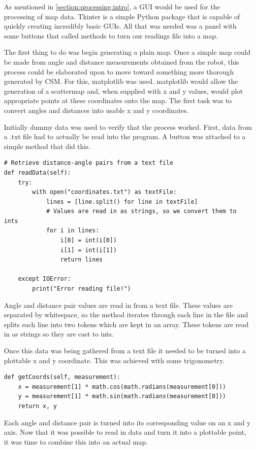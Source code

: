				As mentioned in \ref{section:processing:intro}, a GUI would be used for the processing of map data. Tkinter is a simple Python package that is capable of quickly creating incredibly basic GUIs. All that was needed was a panel with some buttons that called methods to turn our readings file into a map.
				
				The first thing to do was begin generating a plain map. Once a simple map could be made from angle and distance measurements obtained from the robot, this process could be elaborated upon to move toward something more thorough generated by CSM. For this, matplotlib was used. matplotlib would allow the generation of a scattermap and, when supplied with x and y values, would plot appropriate points at these coordinates onto the map. The first task was to convert angles and distances into usable x and y coordinates.
				
				Initially dummy data was used to verify that the process worked. First, data from a .txt file had to actually be read into the program. A button was attached to a simple method that did this.
				\begin{lstlisting}
# Retrieve distance-angle pairs from a text file
def readData(self):
	try:
		with open("coordinates.txt") as textFile:
			lines = [line.split() for line in textFile]
			# Values are read in as strings, so we convert them to ints
			for i in lines:
				i[0] = int(i[0])
				i[1] = int(i[1])
				return lines
					
	except IOError:
		print("Error reading file!") 
				\end{lstlisting}
				Angle and distance pair values are read in from a text file. These values are separated by whitespace, so the method iterates through each line in the file and splits each line into two tokens which are kept in an array. These tokens are read in as strings so they are cast to ints.
				
				Once this data was being gathered from a text file it needed to be turned into a plottable x and y coordinate. This was achieved with some trigonometry.
				\begin{lstlisting}
def getCoords(self, measurement):
	x = measurement[1] * math.cos(math.radians(measurement[0]))
	y = measurement[1] * math.sin(math.radians(measurement[0]))
	return x, y
				\end{lstlisting}
				Each angle and distance pair is turned into its corresponding value on an x and y axis. Now that it was possible to read in data and turn it into a plottable point, it was time to combine this into an actual map.
				
